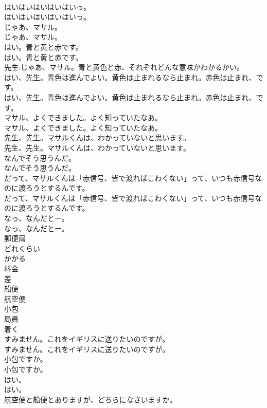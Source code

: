\documentclass[8pt]{extreport}
\begin{document}
\begin{CJK}{UTF8}{min}
\\	はいはいはいはいはいっ。	
\\	はいはいはいはいはいっ。 
\\	じゃあ、マサル。	
\\	じゃあ、マサル。 
\\	はい。青と黄と赤です。	
\\	はい。青と黄と赤です。 
\\	先生:じゃあ、マサル。青と黄色と赤、それぞれどんな意味かわかるかい。	
\\	はい、先生。青色は進んでよい。黄色は止まれるなら止まれ。赤色は止まれ、です。	
\\	はい、先生。青色は進んでよい。黄色は止まれるなら止まれ。赤色は止まれ、です。 
\\	マサル、よくできました。よく知っていたなあ。	
\\	マサル、よくできました。よく知っていたなあ。 
\\	先生、先生。マサルくんは、わかっていないと思います。	
\\	先生、先生。マサルくんは、わかっていないと思います。 
\\	なんでそう思うんだ。	
\\	なんでそう思うんだ。 
\\	だって、マサルくんは「赤信号、皆で渡ればこわくない」って、いつも赤信号なのに渡ろうとするんです。	
\\	だって、マサルくんは「赤信号、皆で渡ればこわくない」って、いつも赤信号なのに渡ろうとするんです。 
\\	なっ、なんだとー。	
\\	なっ、なんだとー。 
\\	郵便局
\\	どれくらい
\\	かかる
\\	料金
\\	差
\\	船便
\\	航空便
\\	小包
\\	局員
\\	着く
\\	すみません。これをイギリスに送りたいのですが。	
\\	すみません。これをイギリスに送りたいのですが。 
\\	小包ですか。	
\\	小包ですか。 
\\	はい。	
\\	はい。 
\\	航空便と船便とありますが、どちらになさいますか。	

\end{CJK}
\end{document}
